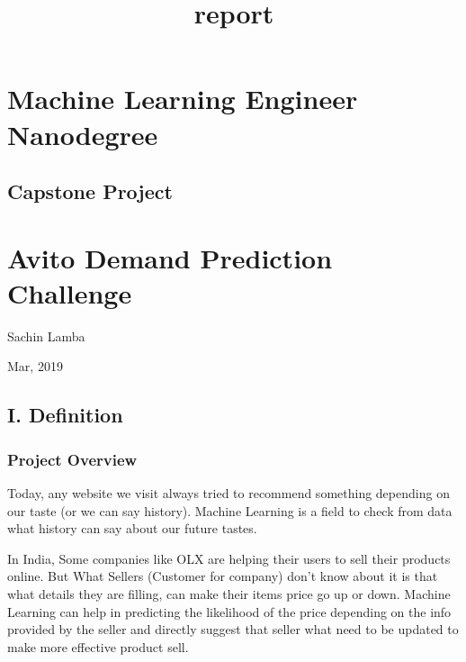 \documentclass[11pt]{article}
\title{report}
\begin{document}
    
    
    \maketitle
    
    

    
    \hypertarget{machine-learning-engineer-nanodegree}{%
\section{Machine Learning Engineer
Nanodegree}\label{machine-learning-engineer-nanodegree}}

    \hypertarget{capstone-project}{%
\subsection{Capstone Project}\label{capstone-project}}

\hypertarget{avito-demand-prediction-challenge}{%
\section{Avito Demand Prediction
Challenge}\label{avito-demand-prediction-challenge}}

Sachin Lamba

Mar, 2019

    \hypertarget{i.-definition}{%
\subsection{I. Definition}\label{i.-definition}}

    \hypertarget{project-overview}{%
\subsubsection{Project Overview}\label{project-overview}}

    Today, any website we visit always tried to recommend something
depending on our taste (or we can say history). Machine Learning is a
field to check from data what history can say about our future tastes.

In India, Some companies like OLX are helping their users to sell their
products online. But What Sellers (Customer for company) don't know
about it is that what details they are filling, can make their items
price go up or down. Machine Learning can help in predicting the
likelihood of the price depending on the info provided by the seller and
directly suggest that seller what need to be updated to make more
effective product sell.
\end{document}
